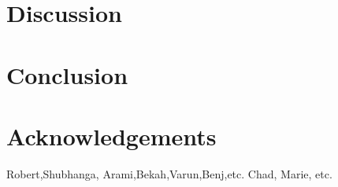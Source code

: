 \documentclass[draft,jgrga]{AGUTeX}
\begin{document}
\section{Discussion}\label{discussion}

\section{Conclusion}\label{conclusion}

\section{Acknowledgements}
Robert,Shubhanga, Arami,Bekah,Varun,Benj,etc.
Chad, Marie, etc.



\end{document}
